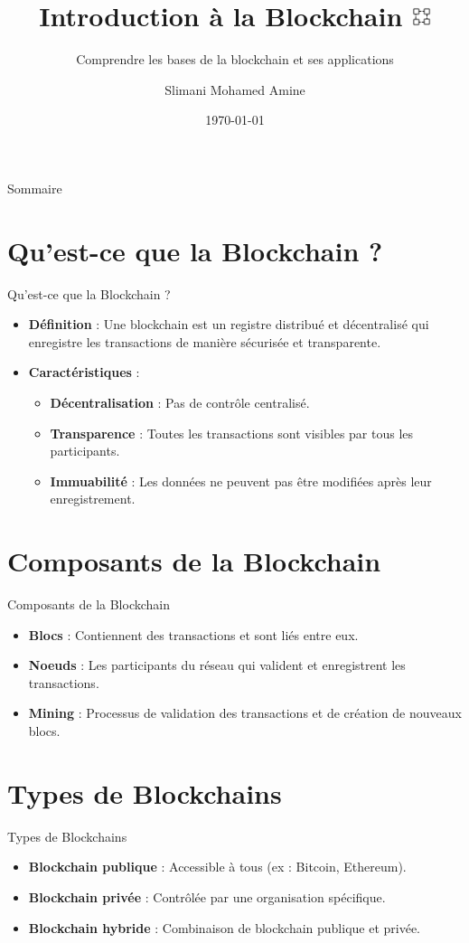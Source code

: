 \documentclass{clbeamer2024}
\title{
        Introduction à la Blockchain
	\includegraphics[width=0.55cm]{logos/Blockchain.png} \hfill
}
\subtitle{Comprendre les bases de la blockchain et ses applications}
\author{Slimani Mohamed Amine}
\institute{EHTP}
\date{\today}
\begin{document}
	\setcounter{framenumber}{-1}
	\frame{\titlepage}
	
	
	
	\begin{frame}{Sommaire}
		\tableofcontents
	\end{frame}
	
	\section{Qu'est-ce que la Blockchain ?}
	\begin{frame}{Qu'est-ce que la Blockchain ?}
		\begin{itemize}
			\item \textbf{Définition} : Une blockchain est un registre distribué et décentralisé qui enregistre les transactions de manière sécurisée et transparente.
			\item \textbf{Caractéristiques} :
			\begin{itemize}
				\item \textbf{Décentralisation} : Pas de contrôle centralisé.
				\item \textbf{Transparence} : Toutes les transactions sont visibles par tous les participants.
				\item \textbf{Immuabilité} : Les données ne peuvent pas être modifiées après leur enregistrement.
			\end{itemize}
		\end{itemize}
	\end{frame}


\section{Composants de la Blockchain}
\begin{frame}{Composants de la Blockchain}
	\begin{itemize}
		\item \textbf{Blocs} : Contiennent des transactions et sont liés entre eux.
		\item \textbf{Noeuds} : Les participants du réseau qui valident et enregistrent les transactions.
		\item \textbf{Mining} : Processus de validation des transactions et de création de nouveaux blocs.
	\end{itemize}
\end{frame}

\section{Types de Blockchains}
\begin{frame}{Types de Blockchains}
	\begin{itemize}
		\item \textbf{Blockchain publique} : Accessible à tous (ex : Bitcoin, Ethereum).
		\item \textbf{Blockchain privée} : Contrôlée par une organisation spécifique.
		\item \textbf{Blockchain hybride} : Combinaison de blockchain publique et privée.
	\end{itemize}
\end{frame}
\end{document}
